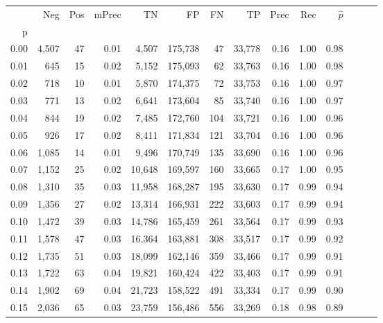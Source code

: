 \begin{tabular}{rrrrrrrrrrrrrr}
\toprule
{} &    Neg &  Pos & mPrec &       TN &       FP &      FN &      TP &  Prec &   Rec & $\hat{p}$ \\
p    &        &      &       &          &          &         &         &       &       &           \\
\midrule
0.00 &  4,507 &   47 &  0.01 &    4,507 &  175,738 &      47 &  33,778 &  0.16 &  1.00 &      0.98 \\
0.01 &    645 &   15 &  0.02 &    5,152 &  175,093 &      62 &  33,763 &  0.16 &  1.00 &      0.98 \\
0.02 &    718 &   10 &  0.01 &    5,870 &  174,375 &      72 &  33,753 &  0.16 &  1.00 &      0.97 \\
0.03 &    771 &   13 &  0.02 &    6,641 &  173,604 &      85 &  33,740 &  0.16 &  1.00 &      0.97 \\
0.04 &    844 &   19 &  0.02 &    7,485 &  172,760 &     104 &  33,721 &  0.16 &  1.00 &      0.96 \\
0.05 &    926 &   17 &  0.02 &    8,411 &  171,834 &     121 &  33,704 &  0.16 &  1.00 &      0.96 \\
0.06 &  1,085 &   14 &  0.01 &    9,496 &  170,749 &     135 &  33,690 &  0.16 &  1.00 &      0.96 \\
0.07 &  1,152 &   25 &  0.02 &   10,648 &  169,597 &     160 &  33,665 &  0.17 &  1.00 &      0.95 \\
0.08 &  1,310 &   35 &  0.03 &   11,958 &  168,287 &     195 &  33,630 &  0.17 &  0.99 &      0.94 \\
0.09 &  1,356 &   27 &  0.02 &   13,314 &  166,931 &     222 &  33,603 &  0.17 &  0.99 &      0.94 \\
0.10 &  1,472 &   39 &  0.03 &   14,786 &  165,459 &     261 &  33,564 &  0.17 &  0.99 &      0.93 \\
0.11 &  1,578 &   47 &  0.03 &   16,364 &  163,881 &     308 &  33,517 &  0.17 &  0.99 &      0.92 \\
0.12 &  1,735 &   51 &  0.03 &   18,099 &  162,146 &     359 &  33,466 &  0.17 &  0.99 &      0.91 \\
0.13 &  1,722 &   63 &  0.04 &   19,821 &  160,424 &     422 &  33,403 &  0.17 &  0.99 &      0.91 \\
0.14 &  1,902 &   69 &  0.04 &   21,723 &  158,522 &     491 &  33,334 &  0.17 &  0.99 &      0.90 \\
0.15 &  2,036 &   65 &  0.03 &   23,759 &  156,486 &     556 &  33,269 &  0.18 &  0.98 &      0.89 \\

\end{tabular}
